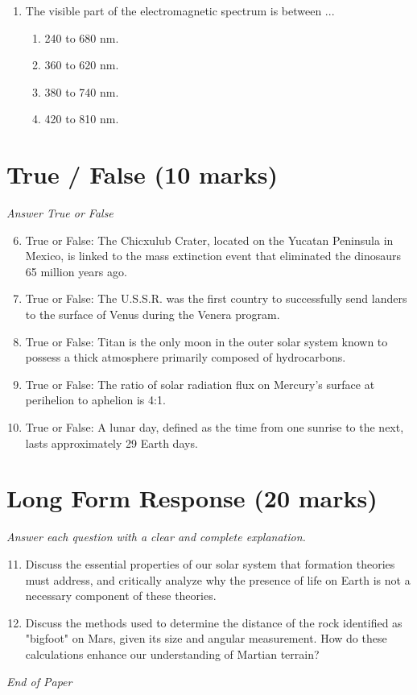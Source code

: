 \documentclass[12pt]{article}
\begin{document}
\begin{enumerate}[label=\arabic*.]
\begin{enumerate}[label=(\alph*)]
    \item 150 million km
    \item 170 million km
    \item 190 million km
\end{enumerate}
\item The visible part of the electromagnetic spectrum is between ...
\begin{enumerate}[label=(\alph*)]
    \item 240 to 680 nm.
    \item 360 to 620 nm.
    \item 380 to 740 nm.
    \item 420 to 810 nm.
\end{enumerate}
\end{enumerate}

\section*{True / False (10 marks)}
\textit{Answer True or False}
\begin{enumerate}[label=\arabic*.]
\setcounter{enumi}{5}
\item True or False: The Chicxulub Crater, located on the Yucatan Peninsula in Mexico, is linked to the mass extinction event that eliminated the dinosaurs 65 million years ago.
\item True or False: The U.S.S.R. was the first country to successfully send landers to the surface of Venus during the Venera program.
\item True or False: Titan is the only moon in the outer solar system known to possess a thick atmosphere primarily composed of hydrocarbons.
\item True or False: The ratio of solar radiation flux on Mercury's surface at perihelion to aphelion is 4:1.
\item True or False: A lunar day, defined as the time from one sunrise to the next, lasts approximately 29 Earth days.
\end{enumerate}

\section*{Long Form Response (20 marks)}
\textit{Answer each question with a clear and complete explanation.}
\begin{enumerate}[label=\arabic*.]
\setcounter{enumi}{10}
\item Discuss the essential properties of our solar system that formation theories must address, and critically analyze why the presence of life on Earth is not a necessary component of these theories.
\item Discuss the methods used to determine the distance of the rock identified as "bigfoot" on Mars, given its size and angular measurement. How do these calculations enhance our understanding of Martian terrain?
\end{enumerate}

\vfill
\noindent\textit{End of Paper}
\end{document}
